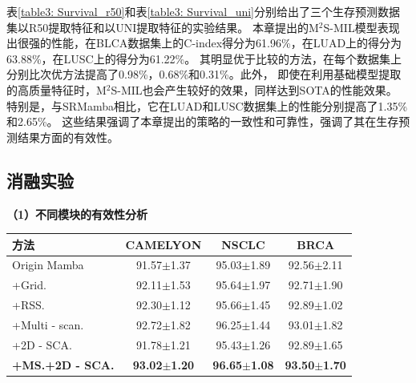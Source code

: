 表\ref{table3: Survival_r50}和表\ref{table3: Survival_uni}分别给出了三个生存预测数据集以R50提取特征和以UNI提取特征的实验结果。
本章提出的M$^2$S-MIL模型表现出很强的性能，在BLCA数据集上的C-index得分为61.96\%，在LUAD上的得分为63.88\%，在LUSC上的得分为61.22\%。
其明显优于比较的方法，在每个数据集上分别比次优方法提高了0.98\%，0.68\%和0.31\%。此外，
即使在利用基础模型提取的高质量特征时，M$^2$S-MIL也会产生较好的效果，同样达到SOTA的性能效果。
特别是，与SRMamba相比，它在LUAD和LUSC数据集上的性能分别提高了1.35\%和2.65\%。
这些结果强调了本章提出的策略的一致性和可靠性，强调了其在生存预测结果方面的有效性。


\subsection[\hspace{-2pt}消融实验]{{\heiti{} \hspace{-8pt}消融实验}}\label{section3: 消融实验}

\textbf{（1）不同模块的有效性分析}


\begin{table}[h!]
  \large    %
  \centering
  \begin{tabularx}{\textwidth}{lCCC}
    \toprule
    方法 & CAMELYON& NSCLC&BRCA\\ \midrule
    Origin Mamba &  91.57$\pm$1.37 & 95.03$\pm$1.89 & 92.56$\pm$2.11  \\
    +Grid.  & 92.11$\pm$1.53 &  95.64$\pm$1.97 & 92.71$\pm$1.90 \\
    +RSS.  & 92.30$\pm$1.12 &  95.66$\pm$1.45 & 92.89$\pm$1.02 \\
    +Multi - scan.  & 92.72$\pm$1.82 &  96.25$\pm$1.44 & 93.01$\pm$1.82 \\
    +2D - SCA.  &  91.78$\pm$1.21 & 95.43$\pm$1.26 & 92.89$\pm$1.65 \\
    \textbf{+MS.+2D - SCA.} &\textbf{93.02$\pm$1.20} &\textbf{96.65$\pm$1.08}  &\textbf{93.50$\pm$1.70} \\
    \bottomrule
  \end{tabularx}
  \label{table3: module ablation}
\end{table}

